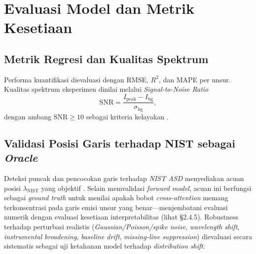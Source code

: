 \section{Evaluasi Model dan Metrik Kesetiaan}

\subsection{Metrik Regresi dan Kualitas Spektrum}
Performa kuantifikasi dievaluasi dengan RMSE, $R^2$, dan MAPE per unsur. Kualitas spektrum eksperimen dinilai melalui \textit{Signal-to-Noise Ratio}
\begin{equation} \label{eq:bab2ai_snr}
    \mathrm{SNR} = \frac{I_{\text{peak}} - I_{\text{bg}}}{\sigma_{\text{bg}}},
\end{equation}
dengan ambang $\mathrm{SNR} \geq 10$ sebagai kriteria kelayakan \citep{khan_magnetic_2022, guerrini_optimization_2025}.

\subsection{Validasi Posisi Garis terhadap NIST sebagai \textit{Oracle}}
Deteksi puncak dan pencocokan garis terhadap \textit{NIST ASD} menyediakan acuan posisi $\lambda_{\mathrm{NIST}}$ yang objektif \citep{legnaioli_laser-induced_2025}. Selain memvalidasi \textit{forward model}, acuan ini berfungsi sebagai \textit{ground truth} untuk menilai apakah bobot \textit{cross-attention} memang terkonsentrasi pada garis emisi unsur yang benar---menjembatani evaluasi numerik dengan evaluasi kesetiaan interpretabilitas (lihat §2.4.5). Robustness terhadap perturbasi realistis (\textit{Gaussian/Poisson/spike noise}, \textit{wavelength shift}, \textit{instrumental broadening}, \textit{baseline drift}, \textit{missing-line suppression}) dievaluasi secara sistematis sebagai uji ketahanan model terhadap \textit{distribution shift}.
